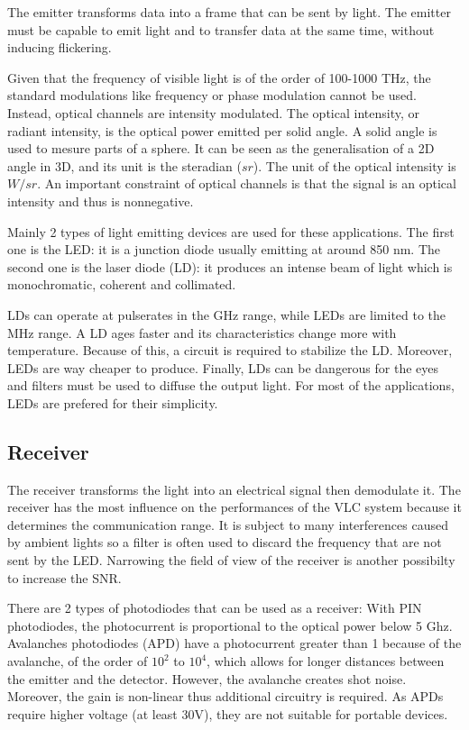 \documentclass[12pt]{report}
\begin{document}
The emitter transforms data into a frame that can be sent by light. The emitter must be capable to emit light and to transfer data at the same time, without inducing flickering.

Given that the frequency of visible light is of the order of 100-1000 THz, the standard modulations like frequency or phase modulation cannot be used. Instead, optical channels are intensity modulated. The optical intensity, or radiant intensity, is the optical power emitted per solid angle. A solid angle is used to mesure parts of a sphere. It can be seen as the generalisation of a 2D angle in 3D, and its unit is the steradian ($sr$). The unit of the optical intensity is $W/sr$. An important constraint of optical channels is that the signal is an optical intensity and thus is nonnegative.

Mainly 2 types of light emitting devices are used for these applications.
The first one is the LED: it is a junction diode usually emitting at around 850 nm.
The second one is the laser diode (LD): it produces an intense beam of light which is monochromatic, coherent and collimated.

LDs can operate at pulserates in the GHz range, while LEDs are limited to the MHz range. A LD ages faster and its characteristics change more with temperature. Because of this, a circuit is required to stabilize the LD. Moreover, LEDs are way cheaper to produce. Finally, LDs can be dangerous for the eyes and filters must be used to diffuse the output light. For most of the applications, LEDs are prefered for their simplicity.

\subsection{Receiver}

The receiver transforms the light into an electrical signal then demodulate it. The receiver has the most influence on the performances of the VLC system because it determines the communication range. It is subject to many interferences caused by ambient lights so a filter is often used to discard the frequency that are not sent by the LED. Narrowing the field of view of the receiver is another possibilty to increase the SNR.

There are 2 types of photodiodes that can be used as a receiver:
With PIN photodiodes, the photocurrent is proportional to the optical power below 5 Ghz.
Avalanches photodiodes (APD) have a photocurrent greater than 1 because of the avalanche, of the order of $10^2$ to $10^4$, which allows for longer distances between the emitter and the detector. However, the avalanche creates shot noise. Moreover, the gain is non-linear thus additional circuitry is required. As APDs require higher voltage (at least 30V), they are not suitable for portable devices.
\end{document}
